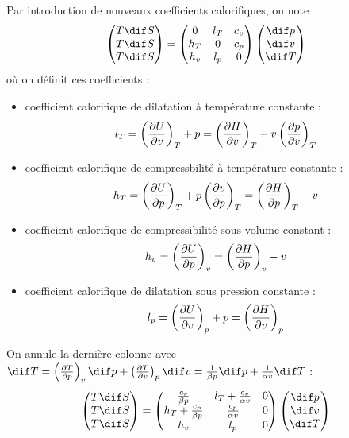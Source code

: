 Par introduction de nouveaux coefficients calorifiques, on note
\[ 
	\begin{pmatrix} T \dif S \\ T \dif S \\ T \dif S \end{pmatrix} = 
	\begin{pmatrix}
		0	& l_T	& c_v	\\
		h_T	& 0		& c_p	\\
		h_v	& l_p	& 0
	\end{pmatrix}
	\begin{pmatrix} \dif p \\ \dif v \\ \dif T \end{pmatrix}
\]
où on définit ces coefficients :
\begin{itemize}
	\item coefficient calorifique de dilatation à température constante :
		\[ l_T = \left(\pdv{U}{v}\right)_{T} + p = \left(\pdv{H}{v}\right)_{T} - v \left(\pdv{p}{v}\right)_{T} \]
	\item coefficient calorifique de compressbilité à température constante :
		\[ h_T = \left(\pdv{U}{p}\right)_{T} + p \left(\pdv{v}{p}\right)_{T} = \left(\pdv{H}{p}\right)_{T} - v \]
	\item coefficient calorifique de compressibilité sous volume constant :
		\[ h_v = \left(\pdv{U}{p}\right)_{v} = \left(\pdv{H}{p}\right)_{v} - v \]
	\item coefficient calorifique de dilatation sous pression constante :
		\[ l_p = \left(\pdv{U}{v}\right)_{p} + p = \left(\pdv{H}{v}\right)_{p} \]
\end{itemize}
On annule la dernière colonne avec $ \dif T = \thermodiff{T}{p}{v} \dif p + \thermodiff{T}{v}{p} \dif v = \frac{1}{\beta p} \dif p + \frac{1}{\alpha v} \dif T $ :
\[ 
	\begin{pmatrix} T \dif S \\ T \dif S \\ T \dif S \end{pmatrix} = 
	\begin{pmatrix}
		\frac{c_v}{\beta p}			& l_T + \frac{c_v}{\alpha v}	& 0	\\
		h_T + \frac{c_p}{\beta p}	& \frac{c_p}{\alpha v}			& 0	\\
		h_v							& l_p							& 0
	\end{pmatrix}
	\begin{pmatrix} \dif p \\ \dif v \\ \dif T \end{pmatrix}
\]
